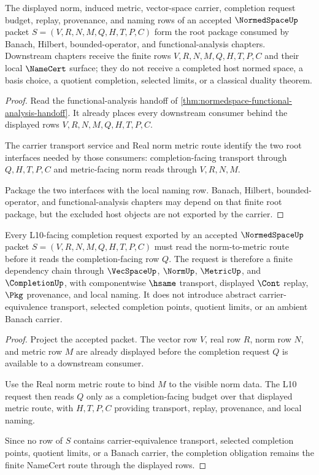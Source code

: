 \begin{theorem}
\label{thm:normedspace-functional-analysis-root-package}
The displayed norm, induced metric, vector-space carrier, completion request
budget, replay, provenance, and naming rows of an accepted $\NormedSpaceUp$
packet $S=(V,R,N,M,Q,H,T,P,C)$ form the root package consumed by Banach,
Hilbert, bounded-operator, and functional-analysis chapters. Downstream
chapters receive the finite rows $V,R,N,M,Q,H,T,P,C$ and their local
$\NameCert$ surface; they do not receive a completed host normed space, a basis
choice, a quotient completion, selected limits, or a classical duality theorem.
\end{theorem}
\begin{proof}
Read the functional-analysis handoff of
\autoref{thm:normedspace-functional-analysis-handoff}. It already places every
downstream consumer behind the displayed rows $V,R,N,M,Q,H,T,P,C$.

The carrier transport service and Real norm metric route identify the two root
interfaces needed by those consumers: completion-facing transport through
$Q,H,T,P,C$ and metric-facing norm reads through $V,R,N,M$.

Package the two interfaces with the local naming row. Banach, Hilbert,
bounded-operator, and functional-analysis chapters may depend on that finite
root package, but the excluded host objects are not exported by the carrier.
\end{proof}

\begin{theorem}
\label{thm:normedspace-l10-completion-obligation}
Every L10-facing completion request exported by an accepted $\NormedSpaceUp$
packet $S=(V,R,N,M,Q,H,T,P,C)$ must read the norm-to-metric route before it
reads the completion-facing row $Q$. The request is therefore a finite
dependency chain through $\VecSpaceUp$, $\NormUp$, $\MetricUp$, and
$\CompletionUp$, with componentwise $\hsame$ transport, displayed $\Cont$
replay, $\Pkg$ provenance, and local naming. It does not introduce abstract
carrier-equivalence transport, selected completion points, quotient limits, or
an ambient Banach carrier.
\end{theorem}
\begin{proof}
Project the accepted packet. The vector row $V$, real row $R$, norm row $N$,
and metric row $M$ are already displayed before the completion request $Q$ is
available to a downstream consumer.

Use the Real norm metric route to bind $M$ to the visible norm data. The L10
request then reads $Q$ only as a completion-facing budget over that displayed
metric route, with $H,T,P,C$ providing transport, replay, provenance, and local
naming.

Since no row of $S$ contains carrier-equivalence transport, selected completion
points, quotient limits, or a Banach carrier, the completion obligation remains
the finite NameCert route through the displayed rows.
\end{proof}


